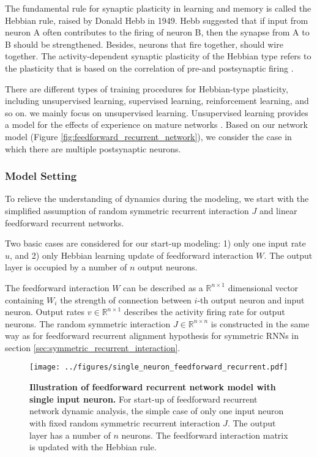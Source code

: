 \documentclass[11pt]{article}
\begin{document}
	The fundamental rule for synaptic plasticity in learning and memory is called the Hebbian rule, raised by Donald Hebb in 1949. Hebb suggested that if input from neuron A often contributes to the firing of neuron B, then the synapse from A to B should be strengthened. Besides, neurons that fire together, should wire together. The activity-dependent synaptic plasticity of the Hebbian type refers to the plasticity that is based on the correlation of pre-and postsynaptic firing \cite{dayan2005theoretical}. 
	
	There are different types of training procedures for Hebbian-type plasticity, including unsupervised learning, supervised learning, reinforcement learning, and so on. we mainly focus on unsupervised learning. Unsupervised learning provides a model for the effects of experience on mature networks \cite{dayan2005theoretical}. Based on our network model (Figure \ref{fig:feedforward_recurrent_network}), we consider the case in which there are multiple postsynaptic neurons. 
	
	\subsubsection{Model Setting}
	To relieve the understanding of dynamics during the modeling, we start with the simplified assumption of random symmetric recurrent interaction $J$ and linear feedforward recurrent networks.
	
	Two basic cases are considered for our start-up modeling: 1) only one input rate $u$, and 2) only Hebbian learning update of feedforward interaction $W$. The output layer is occupied by a number of $n$ output neurons. 
	
	The feedforward interaction $W$ can be described as a $\mathbb{R}^{n \times 1}$ dimensional vector containing $W_i$ the strength of connection between $i$-th output neuron and input neuron. Output rates $v \in \mathbb{R}^{n \times 1}$ describes the activity firing rate for output neurons. The random symmetric interaction $J \in \mathbb{R}^{n \times n}$ is constructed in the same way as for feedforward recurrent alignment hypothesis for symmetric RNNs in section \ref{sec:symmetric_recurrent_interaction}. 
	
		\begin{figure}[H]
			\centering
			\texttt{[image: ../figures/single\_neuron\_feedforward\_recurrent.pdf]}
			\caption[Illustration of feedforward recurrent network model with single input neuron]{\textbf{Illustration of feedforward recurrent network model with single input neuron.} For start-up of feedforward recurrent network dynamic analysis, the simple case of only one input neuron with fixed random symmetric recurrent interaction $J$. The output layer has a number of $n$ neurons. The feedforward interaction matrix is updated with the Hebbian rule.}
			\label{fig:single_neuron_feedforward_recurrent_network}
		\end{figure}
	
\end{document}
